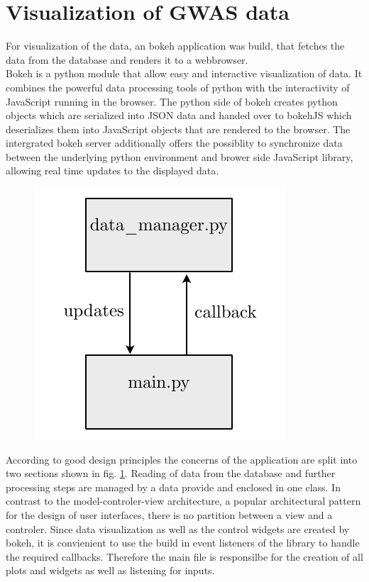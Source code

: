 \section{Visualization of GWAS data}
\label{sec:gwas_vis}
For visualization of the data, an bokeh application was build, that fetches the data from the database and renders it to a webbrowser.\\
Bokeh is a python module that allow easy and interactive visualization of data. It combines the powerful data processing tools of python with the interactivity of JavaScript running in the browser. The python side of bokeh creates python objects which are serialized into JSON data and handed over to bokehJS which deserializes them into JavaScript objects that are rendered to the browser. The intergrated bokeh server additionally offers the possiblity to synchronize data between the underlying python environment and brower side JavaScript library, allowing real time updates to the displayed data.

    \begin{figure}[h]
    \capstart
        \centering
    	\includegraphics{Abbildung/vis_architecture.pdf}

    	\begin{minipage}{\captionwidth}
    		\caption[vis archi]{ \newline }
    		\label{fig:plot_architecture}
    	\end{minipage}
    \end{figure}

According to good design principles the concerns of the application are split into two sections shown in fig. \ref{fig:plot_architecture}. Reading of data from the database and further processing steps are managed by a data provide and enclosed in one class. In contrast to the model-controler-view architecture, a popular architectural pattern for the design of user interfaces, there is no partition between a view and a controler. Since data visualization as well as the control widgets are created by bokeh, it is convienient to use the build in event listeners of the library to handle the required callbacks. Therefore the main file is responsilbe for the creation of all plots and widgets as well as listening for inputs.

